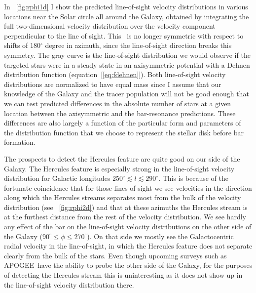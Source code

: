 \documentclass[12pt,preprint]{aastex}
\newcommand{\eqnname}{equation}
\newcommand{\apogee}{APOGEE}
\begin{document}
In \figurename~\ref{fig:rphi1d} I show the predicted line-of-sight
velocity distributions in various locations near the Solar circle all
around the Galaxy, obtained by integrating the full two-dimensional
velocity distribution over the velocity component perpendicular to the
line of sight. This \figurename\ is no longer symmetric with respect
to shifts of 180$^{\circ}$ degree in azimuth, since the line-of-sight
direction breaks this symmetry. The gray curve is the line-of-sight
distribution we would observe if the targeted stars were in a steady
state in an axisymmetric potential with a Dehnen distribution function
(\eqnname~[\ref{eq:fdehnen}]). Both line-of-sight velocity
distributions are normalized to have equal mass since I assume that
our knowledge of the Galaxy and the tracer population will not be good
enough that we can test predicted differences in the absolute number
of stars at a given location between the axisymmetric and the
bar-resonance predictions. These differences are also largely a
function of the particular form and parameters of the distribution
function that we choose to represent the stellar disk before bar
formation.

The prospects to detect the Hercules feature are quite good on our
side of the Galaxy. The Hercules feature is especially strong in the
line-of-sight velocity distribution for Galactic longitudes
$250^{\circ} \lesssim l \lesssim 290^{\circ}$. This is because of the
fortunate coincidence that for those lines-of-sight we see velocities
in the direction along which the Hercules streams separates most from
the bulk of the velocity distribution (see
\figurename~\ref{fig:rphi2d}) and that at these azimuths the Hercules
stream is at the furthest distance from the rest of the velocity
distribution. We see hardly any effect of the bar on the line-of-sight
velocity distributions on the other side of the Galaxy ($90^{\circ}
\leq \phi \leq 270^{\circ}$). On that side we mostly see the
Galactocentric radial velocity in the line-of-sight, in which the
Hercules feature does not separate clearly from the bulk of the
stars. Even though upcoming surveys such as \apogee\ have the ability
to probe the other side of the Galaxy, for the purposes of detecting
the Hercules stream this is uninteresting as it does not show up in
the line-of-sight velocity distribution there.
\end{document}
